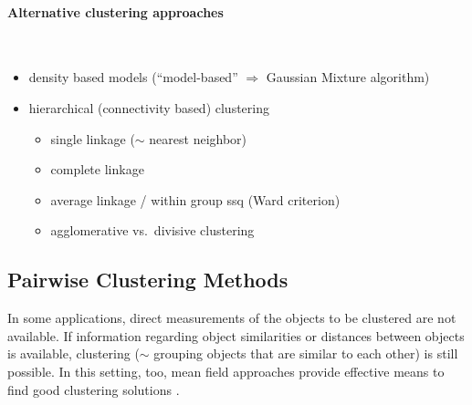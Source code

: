 \paragraph{Alternative clustering approaches}\mbox{}\\
\begin{itemize}
 \item  density based models (``model-based'' $\Rightarrow$ Gaussian Mixture algorithm)
 \item  hierarchical (connectivity based) clustering 
 \begin{itemize}
 \item single linkage ($\sim$ nearest neighbor)
 \item complete linkage
 \item average linkage / within group ssq (Ward criterion)
 \item agglomerative vs.\ divisive clustering
\end{itemize}
\end{itemize}

\subsection{Pairwise Clustering Methods}
In some applications, direct measurements of the objects to be
clustered are not available. If information regarding object
similarities or distances between objects is available, clustering
($\sim$ grouping objects that are similar to each other) is still
possible. In this setting, too, mean field approaches provide
effective means to find good clustering solutions
\citep{HofmannBuhmann1997}.


